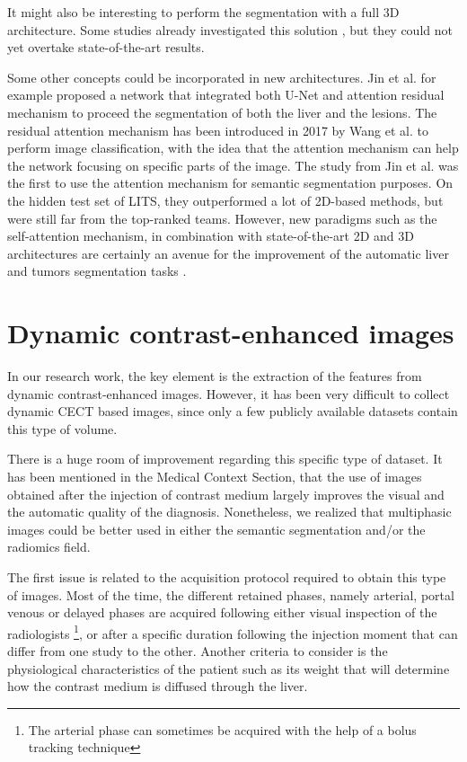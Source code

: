 It might also be interesting to perform the segmentation with a full 3D
architecture. Some studies already investigated this solution \cite{Dou2016}, but they could not yet overtake state-of-the-art
results. 

Some other concepts could be incorporated in new architectures. Jin et
al. \cite{Jin2018} for example proposed a network that integrated both U-Net and
attention residual mechanism to proceed the segmentation of both the
liver and the lesions. The residual attention mechanism has been
introduced in 2017 by Wang et al. \cite{Wang2017} to perform image
classification, with the idea that the attention mechanism can help the
network focusing on specific parts of the image. The study from Jin et
al. was the first to use the attention mechanism for
semantic segmentation purposes. On the hidden test set of LITS, they
outperformed a lot of 2D-based methods, but were still far from the
top-ranked teams. However, new paradigms such as the self-attention
mechanism, in combination with state-of-the-art 2D and 3D architectures
are certainly an avenue for the improvement of the automatic liver and
tumors segmentation tasks \cite{Chen2019}.

\section{Dynamic contrast-enhanced images}

In our research work, the key element is the extraction of the features
from dynamic contrast-enhanced images. However, it has been very
difficult to collect dynamic CECT based images, since only a few
publicly available datasets contain this type of volume.

There is a huge room of improvement regarding this specific type of
dataset. It has been mentioned in the Medical Context Section, that the
use of images obtained after the injection of contrast medium largely
improves the visual and the automatic quality of the diagnosis.
Nonetheless, we realized that multiphasic images could be better used in
either the semantic segmentation and/or the radiomics field.

The first issue is related to the acquisition protocol required to
obtain this type of images. Most of the time, the different retained
phases, namely arterial, portal venous or delayed phases are acquired
following either visual inspection of the radiologists \footnote{The arterial phase can sometimes be acquired
with the help of a bolus tracking technique}, or after a specific
duration following the injection moment that can differ from one study
to the other. Another criteria to consider is the physiological
characteristics of the patient such as its weight that will determine
how the contrast medium is diffused through the liver.

